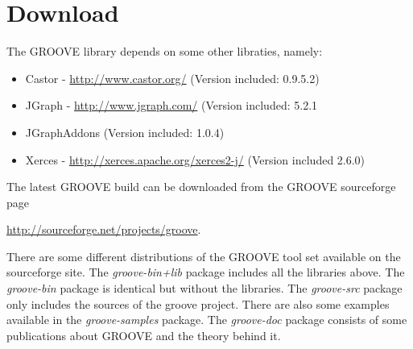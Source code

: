 \section{Download}

The GROOVE library depends on some other libraties, namely:

\begin{itemize}
\item Castor - \url{http://www.castor.org/} (Version included: 0.9.5.2)
\item JGraph - \url{http://www.jgraph.com/} (Version included: 5.2.1 
\item JGraphAddons (Version included: 1.0.4)
\item Xerces - \url{http://xerces.apache.org/xerces2-j/} (Version included 2.6.0)
\end{itemize}

The latest GROOVE build can be downloaded from the GROOVE sourceforge page 

\url{http://sourceforge.net/projects/groove}. 

There are some different distributions of the GROOVE tool set available on the sourceforge site. The \emph{groove-bin+lib} package includes all the libraries above. The \emph{groove-bin} package is identical but without the libraries. The \emph{groove-src} package only includes the sources of the groove project. There are also some examples available in the \emph{groove-samples} package. The \emph{groove-doc} package consists of some publications about GROOVE and the theory behind it. 
